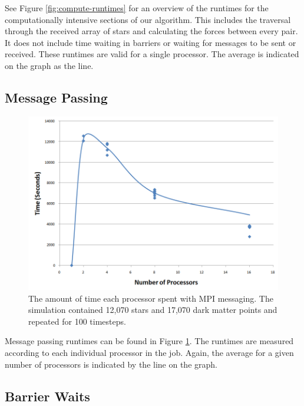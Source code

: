 \documentclass{article}
\begin{document}
See Figure \ref{fig:compute-runtimes} for an overview of the runtimes for the computationally intensive sections of our algorithm.  This includes the traversal through the received array of stars and calculating the forces between every pair.  It does not include time waiting in barriers or waiting for messages to be sent or received.  These runtimes are valid for a single processor.  The average is indicated on the graph as the line.

\subsection{Message Passing}

\begin{figure}
\centering
\includegraphics[width=\columnwidth]{message-runtimes.png}
\caption{The amount of time each processor spent with MPI messaging. The simulation contained 12,070 stars and 17,070 dark matter points and repeated for 100 timesteps. \label{fig:message-runtimes}}
\end{figure} 

Message passing runtimes can be found in Figure \ref{fig:message-runtimes}.  The runtimes are measured according to each individual processor in the job. Again, the average for a given number of processors is indicated by the line on the graph.

\subsection{Barrier Waits}
\end{document}
